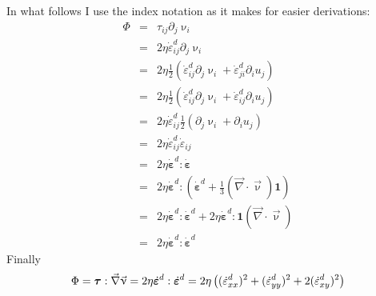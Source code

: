 In what follows I use the index notation as it makes for easier derivations:
\begin{eqnarray}
\Phi 
&=& \tau_{ij}\partial_j \upnu_i \nonumber\\
&=& 2 \eta \dot{\varepsilon}_{ij}^d\partial_j \upnu_i \nonumber\\
&=& 2 \eta \frac{1}{2}\left( \dot{\varepsilon}_{ij}^d\partial_j \upnu_i + \dot{\varepsilon}_{ji}^d\partial_i u_j \right) \nonumber\\
&=& 2 \eta \frac{1}{2}\left( \dot{\varepsilon}_{ij}^d\partial_j \upnu_i + \dot{\varepsilon}_{ij}^d\partial_i u_j \right) \nonumber\\
&=& 2 \eta  \dot{\varepsilon}_{ij}^d  \frac{1}{2}\left(\partial_j \upnu_i + \partial_i u_j \right) \nonumber\\
&=& 2 \eta  \dot{\varepsilon}_{ij}^d   \dot{\varepsilon}_{ij} \nonumber\\
&=& 2 \eta  \dot{\bm \varepsilon}^d :  \dot{\bm \varepsilon} \nonumber\\
&=& 2 \eta  \dot{\bm \varepsilon}^d : \left( \dot{\bm \varepsilon}^d +\frac{1}{3} ({\vec \nabla}\cdot{\vec \upnu}) {\bm 1} \right)\nonumber\\
&=& 2 \eta  \dot{\bm \varepsilon}^d : \dot{\bm \varepsilon}^d 
+ 2 \eta  \dot{\bm \varepsilon}^d : {\bm 1} ({\vec \nabla}\cdot{\vec \upnu}) \nonumber\\ 
&=& 2 \eta  \dot{\bm \varepsilon}^d : \dot{\bm \varepsilon}^d 
\end{eqnarray}
Finally
\begin{equation}
\Phi = {\bm \tau}:{\vec \nabla}{\vec \upnu} = 2 \eta  \dot{\bm \varepsilon}^d : \dot{\bm \varepsilon}^d
= 2 \eta \left( (\dot{\varepsilon}_{xx}^d)^2 + (\dot{\varepsilon}_{yy}^d)^2 + 2(\dot{\varepsilon}_{xy}^d)^2 \right) \nonumber
\end{equation}






